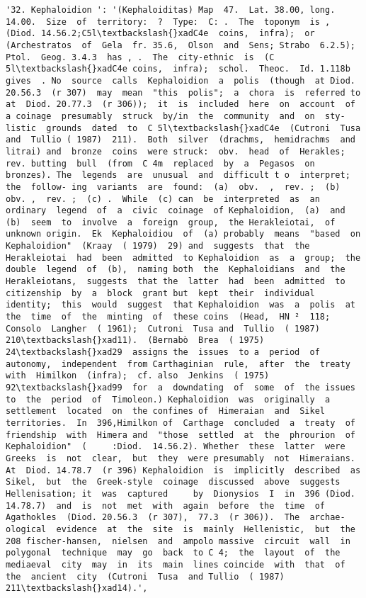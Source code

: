 \documentclass[11pt]{article}
\begin{document}
\begin{Verbatim}[commandchars=\\\{\}]
         '32. Kephaloidion ': '(Kephaloiditas) Map  47.  Lat. 38.00, long. 14.00.  Size  of  territory:  ?  Type:  C: .  The  toponym  is ,  (Diod. 14.56.2;C5l\textbackslash{}xadC4e  coins,  infra);  or (Archestratos  of  Gela  fr. 35.6,  Olson  and  Sens; Strabo  6.2.5);  Ptol.  Geog. 3.4.3  has , .  The  city-ethnic  is  (C 5l\textbackslash{}xadC4e coins,  infra);  schol.  Theoc.  Id. 1.118b  gives  . No  source  calls  Kephaloidion  a  polis  (though  at Diod. 20.56.3  (r 307)  may  mean  "this  polis";  a  chora  is  referred to at  Diod. 20.77.3  (r 306));  it  is  included  here  on  account  of  a coinage  presumably  struck  by/in  the  community  and  on  sty- listic  grounds  dated  to  C 5l\textbackslash{}xadC4e  (Cutroni  Tusa  and  Tullio ( 1987)  211).  Both  silver  (drachms,  hemidrachms  and  litrai) and  bronze  coins  were struck:  obv.  head  of  Herakles;  rev. butting  bull  (from  C 4m  replaced  by  a  Pegasos  on  bronzes). The  legends  are  unusual  and  difficult t o  interpret;  the  follow- ing  variants  are  found:  (a)  obv.  ,  rev. ;  (b)  obv. ,  rev. ;  (c) .  While  (c) can  be  interpreted  as  an  ordinary  legend  of  a  civic  coinage  of Kephaloidion,  (a)  and  (b)  seem  to  involve  a  foreign  group,  the Herakleiotai,  of  unknown origin.  Ek  Kephaloidiou  of  (a) probably  means  "based  on  Kephaloidion"  (Kraay  ( 1979)  29) and  suggests  that  the  Herakleiotai  had  been  admitted  to Kephaloidion  as  a  group;  the  double  legend  of  (b),  naming both  the  Kephaloidians  and  the  Herakleiotans,  suggests  that the  latter  had  been  admitted  to  citizenship  by  a  block  grant but  kept  their  individual  identity;  this  would  suggest  that Kephaloidion  was  a  polis  at  the  time  of  the  minting  of  these coins  (Head,  HN ²  118;  Consolo  Langher  ( 1961);  Cutroni  Tusa and  Tullio  ( 1987)  210\textbackslash{}xad11).  (Bernabò  Brea  ( 1975)  24\textbackslash{}xad29  assigns the  issues  to a  period  of  autonomy,  independent  from Carthaginian  rule,  after  the  treaty  with  Himilkon  (infra);  cf. also  Jenkins  ( 1975)  92\textbackslash{}xad99  for  a  downdating  of  some  of  the issues  to  the  period  of  Timoleon.) Kephaloidion  was  originally  a  settlement  located  on  the confines of  Himeraian  and  Sikel  territories.  In  396,Himilkon of  Carthage  concluded  a  treaty  of  friendship  with  Himera and  "those  settled  at  the  phrourion  of  Kephaloidion"  (     :Diod.  14.56.2). Whether  these  latter  were  Greeks  is  not  clear,  but  they  were presumably  not  Himeraians.  At  Diod. 14.78.7  (r 396) Kephaloidion  is  implicitly  described  as  Sikel,  but  the  Greek-style  coinage  discussed  above  suggests  Hellenisation; it  was  captured     by  Dionysios  I  in  396 (Diod. 14.78.7)  and  is  not  met  with  again  before  the  time  of  Agathokles  (Diod. 20.56.3  (r 307),  77.3  (r 306)).  The  archae- ological  evidence  at  the  site  is  mainly  Hellenistic,  but  the 208 fischer-hansen,  nielsen  and  ampolo massive  circuit  wall  in  polygonal  technique  may  go  back  to C 4;  the  layout  of  the  mediaeval  city  may  in  its  main  lines coincide  with  that  of  the  ancient  city  (Cutroni  Tusa  and Tullio  ( 1987)  211\textbackslash{}xad14).',

\end{Verbatim}
\end{document}
